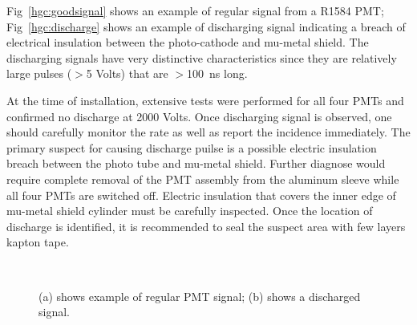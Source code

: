 \documentclass[12pt]{article}
\begin{document}

Fig~\ref{hgc:goodsignal} shows an example of regular signal from a R1584 PMT; Fig~\ref{hgc:discharge} shows an example of discharging signal indicating a breach of electrical insulation between the photo-cathode and mu-metal shield. The discharging signals have very distinctive characteristics since they are relatively large pulses ($>$5 Volts) that are $>$100~ns long. 

At the time of installation, extensive tests were performed for all four PMTs and confirmed no discharge at 2000 Volts. Once discharging signal is observed, one should carefully monitor the rate as well as report the incidence immediately. The primary suspect for causing discharge puilse is a possible electric insulation breach between the photo tube and mu-metal shield. Further diagnose would require complete removal of the PMT assembly from the aluminum sleeve while all four PMTs are switched off. Electric insulation that covers the inner edge of mu-metal shield cylinder must be carefully inspected. Once the location of discharge is identified, it is recommended to seal the suspect area with few layers kapton tape.   







\begin{figure}
     \centering
     ~
     \caption{(a) shows example of regular PMT signal; (b) shows a discharged signal.}
     \label{hgc:signal}
\end{figure}


% 
% 
% 
\end{document}
